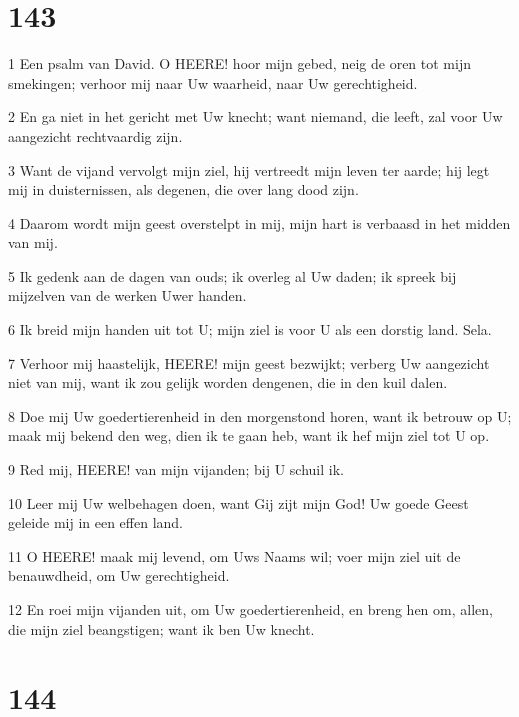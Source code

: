 \chapter{143}

\par 1 Een psalm van David. O HEERE! hoor mijn gebed, neig de oren tot mijn smekingen; verhoor mij naar Uw waarheid, naar Uw gerechtigheid.
\par 2 En ga niet in het gericht met Uw knecht; want niemand, die leeft, zal voor Uw aangezicht rechtvaardig zijn.
\par 3 Want de vijand vervolgt mijn ziel, hij vertreedt mijn leven ter aarde; hij legt mij in duisternissen, als degenen, die over lang dood zijn.
\par 4 Daarom wordt mijn geest overstelpt in mij, mijn hart is verbaasd in het midden van mij.
\par 5 Ik gedenk aan de dagen van ouds; ik overleg al Uw daden; ik spreek bij mijzelven van de werken Uwer handen.
\par 6 Ik breid mijn handen uit tot U; mijn ziel is voor U als een dorstig land. Sela.
\par 7 Verhoor mij haastelijk, HEERE! mijn geest bezwijkt; verberg Uw aangezicht niet van mij, want ik zou gelijk worden dengenen, die in den kuil dalen.
\par 8 Doe mij Uw goedertierenheid in den morgenstond horen, want ik betrouw op U; maak mij bekend den weg, dien ik te gaan heb, want ik hef mijn ziel tot U op.
\par 9 Red mij, HEERE! van mijn vijanden; bij U schuil ik.
\par 10 Leer mij Uw welbehagen doen, want Gij zijt mijn God! Uw goede Geest geleide mij in een effen land.
\par 11 O HEERE! maak mij levend, om Uws Naams wil; voer mijn ziel uit de benauwdheid, om Uw gerechtigheid.
\par 12 En roei mijn vijanden uit, om Uw goedertierenheid, en breng hen om, allen, die mijn ziel beangstigen; want ik ben Uw knecht.

\chapter{144}

